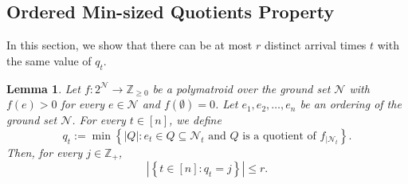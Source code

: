 \documentclass[11pt]{article}
\newtheorem{lemma}{Lemma}
\theoremstyle{definition}
\newcommand{\calN}{{\mathcal{N}}}
\newcommand{\knote}[1]{{\bf{\color{blue}[\tiny Karthik: #1]}}}
\newcommand{\Z}{\mathbb{Z}}
\begin{document}
\subsection{Ordered Min-sized Quotients Property}\label{subsection:property-quotient}


In this section, we show that there can be at most $r$ distinct arrival times $t$ with the same value of $q_t$.

\begin{lemma}\label{lemma:counting-quotient}
Let $f: 2^{\calN}\rightarrow \Z_{\ge 0}$ be a polymatroid over the ground set $\calN$ with $f(e)>0$ for every $e\in \mathcal{N}$ and $f(\emptyset)=0$. Let $e_1, e_2, \ldots, e_n$ be an ordering of the ground set $\calN$. For every $t\in [n]$, we define
\[
q_t:=\min\left\{|Q|: e_t\in Q\subseteq \calN_t \text{ and $Q$ is a quotient of $f_{|\calN_t}$}\right\}. 
\]
Then, for every $j\in \Z_+$,
\[
|\left\{t\in [n]: q_t = j\right\}| \le r.
\]

\iffalse
    \knote{This lemma is crucial and seems interesting by itself. I would prefer to state it completely with all hypothesis.}
\knote{
Let $f: 2^{\calN}\rightarrow \Z_{\ge 0}$ be a polymatroid over the ground set $\calN$ and let $e_1, e_2, \ldots, e_n$ be an ordering of the ground set $\calN$. Let 
\[
q_t:=\min\left\{|Q|: e_t\in Q\subseteq \calN_t \ \& \ \text{$Q$ is a quotient of $f_{|\calN_t}$}\right\} \ \forall t\in [n]. 
\]
Then, 
\[
|\left\{t\in [n]: q_t = j\right\}| \le r\ \forall\ j\in [n].
\]
}
\fi

\end{lemma}
\end{document}
